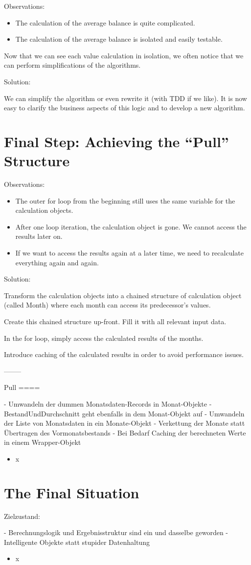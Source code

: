 \documentclass[a4paper,fleqn,titlepage,11pt]{article}
\begin{document}
Observations:
\begin{itemize}
\item The calculation of the average balance is quite complicated.
\item The calculation of the average balance is isolated and easily testable.
\end{itemize}

Now that we can see each value calculation in isolation, we often notice that we can perform simplifications of the algorithms. 

Solution:

We can simplify the algorithm or even rewrite it (with TDD if we like). It is now easy to clarify the business aspects of this logic and to develop a new algorithm.

\section{Final Step: Achieving the ``Pull'' Structure}

Observations:

\begin{itemize}
\item The outer for loop from the beginning still uses the same variable for the calculation objects.
\item After one loop iteration, the calculation object is gone. We cannot access the results later on.
\item If we want to access the results again at a later time, we need to recalculate everything again and again.
\end{itemize}

Solution:

Transform the calculation objects into a chained structure of calculation object (called Month) where each month can access its predecessor's values.

Create this chained structure up-front. Fill it with all relevant input data.

In the for loop, simply access the calculated results of the months.

Introduce caching of the calculated results in order to avoid performance issues.

--------

Pull
====

- Umwandeln der dummen Monatsdaten-Records in Monat-Objekte
- BestandUndDurchschnitt geht ebenfalls in dem Monat-Objekt auf
- Umwandeln der Liste von Monatsdaten in ein Monate-Objekt
- Verkettung der Monate statt Übertragen des Vormonatsbestands
- Bei Bedarf Caching der berechneten Werte in einem Wrapper-Objekt

\begin{itemize}
\item x
\end{itemize}

\section{The Final Situation}

Zielzustand:

- Berechnungslogik und Ergebnisstruktur sind ein und dasselbe geworden
- Intelligente Objekte statt stupider Datenhaltung

\begin{itemize}
\item x
\end{itemize}
\end{document}

